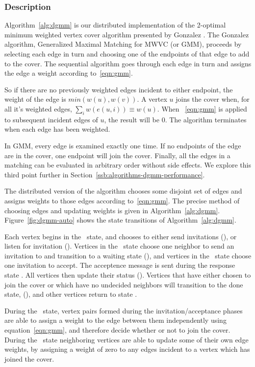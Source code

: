 \label{sub:algorithms-dgmm}
\subsubsection{Description}
Algorithm~\ref{alg:dgmm} is our distributed implementation of the 2-optimal minimum weighted vertex cover algorithm presented by Gonzalez \cite{Gonzalez1995129}. The Gonzalez algorithm, Generalized Maximal Matching for MWVC (or GMM), proceeds by selecting each edge in turn and choosing one of the endpoints of that edge to add to the cover. The sequential algorithm goes through each edge in turn and assigns the edge a weight according to~\eqref{eqn:gmm}.



So if there are no previously weighted edges incident to either endpoint, the weight of the edge is $min(w(u),w(v))$. A vertex $u$ joins the cover when, for all it's weighted edges, $\sum_i w(e(u,i)) \equiv w(u)$. When ~\eqref{eqn:gmm} is applied to subsequent incident edges of $u$, the result will be 0. The algorithm terminates when each edge has been weighted. 

In GMM, every edge is examined exactly one time. If no endpoints of the edge are in the cover, one endpoint will join the cover. Finally, all the edges in a matching can be evaluated in arbitrary order without side effects. We explore this third point further in Section~\ref{ssb:algorithms-dgmm-performance}. 

The distributed version of the algorithm chooses some disjoint set of edges and assigns weights to those edges according to~\eqref{eqn:gmm}. The precise method of choosing edges and updating weights is given in Algorithm~\ref{alg:dgmm}. Figure~\ref{fig:dgmm-auto} shows the state transitions of Algorithm~\ref{alg:dgmm}. 



Each vertex begins in the \cCd\ state, and chooses to either send invitations (\cId), or listen for invitation (\cLd). Vertices in the \cId\ state choose one neighbor to send an invitation to and transition to a waiting state (\cWd), and vertices in the \cLd\ state choose one invitation to accept. The acceptence message is sent during the response state \cRd. All vertices then update their status (\cUd). Vertices that have either chosen to join the cover or which have no undecided neighbors will transition to the done state, (\cDd), and other vertices return to state \cCd.  


During the \cUd\ state, vertex pairs formed during the invitation/acceptance phases are able to assign a weight to the edge between them independently using equation~\ref{eqn:gmm}, and therefore decide whether or not to join the cover. During the \cEd\ state neighboring vertices are able to update some of their own edge weights, by assigning a weight of zero to any edges incident to a vertex which has joined the cover.

